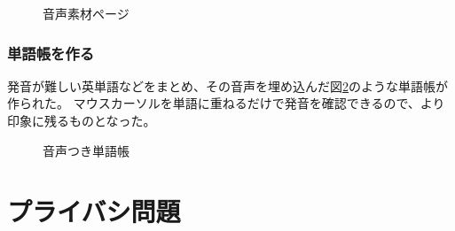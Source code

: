 \begin{figure}[H]
\centering
{}
\caption{音声素材ページ}
\label{hayakawa}
\end{figure}

\subsubsection{単語帳を作る}
発音が難しい英単語などをまとめ、その音声を埋め込んだ図\ref{word}のような単語帳が作られた。
マウスカーソルを単語に重ねるだけで発音を確認できるので、より印象に残るものとなった。

\begin{figure}[H]
\centering
{}
\caption{音声つき単語帳}
\label{word}
\end{figure}



\section{プライバシ問題}
